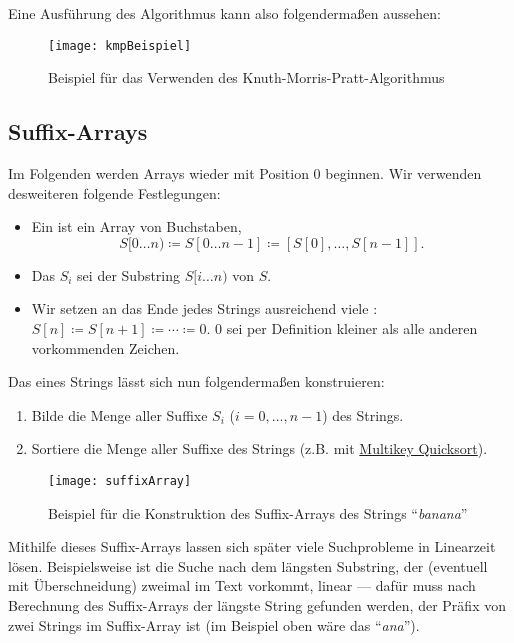 Eine Ausführung des Algorithmus kann also folgendermaßen aussehen:
\begin{figure}[H]
  \texttt{[image: kmpBeispiel]}
  \caption{Beispiel für das Verwenden des Knuth-Morris-Pratt-Algorithmus}
\end{figure}

\subsection{Suffix-Arrays}

Im Folgenden werden Arrays wieder mit Position \( 0 \) beginnen. Wir verwenden desweiteren folgende Festlegungen:
\begin{itemize}
  \item Ein  ist ein Array von Buchstaben,
  \begin{equation*}
    S[0\dots n) \coloneqq S[0\dots n-1] \coloneqq [S[0],\dots,S[n-1]]\text{.}
  \end{equation*}
  \item Das  \( S_i \) sei der Substring \( S[i\dots n) \) von \( S \).
  \item Wir setzen an das Ende jedes Strings ausreichend viele : \( S[n] \coloneqq S[n+1] \coloneqq \cdots \coloneqq 0 \). \( 0 \) sei per Definition kleiner als alle anderen vorkommenden Zeichen.
\end{itemize}

Das  eines Strings lässt sich nun folgendermaßen konstruieren:

\begin{minipage}{.65\textwidth}
  \begin{enumerate}
    \item Bilde die Menge aller Suffixe \( S_i \) (\( i = 0,\dots,n-1 \)) des Strings.
    \item Sortiere die Menge aller Suffixe des Strings (z.B. mit \hyperref[def:multikeyQuicksort]{Multikey Quicksort}).
  \end{enumerate}
\end{minipage}
\hfill
\begin{minipage}{.35\textwidth}
  \begin{figure}[H]
    \texttt{[image: suffixArray]}
    \caption{Beispiel für die Konstruktion des Suffix-Arrays des Strings ``\emph{banana}''}
  \end{figure}
\end{minipage}

Mithilfe dieses Suffix-Arrays lassen sich später viele Suchprobleme in Linearzeit lösen. Beispielsweise ist die Suche nach dem längsten Substring, der (eventuell mit Überschneidung) zweimal im Text vorkommt, linear --- dafür muss nach Berechnung des Suffix-Arrays der längste String gefunden werden, der Präfix von zwei Strings im Suffix-Array ist (im Beispiel oben wäre das ``\emph{ana}'').